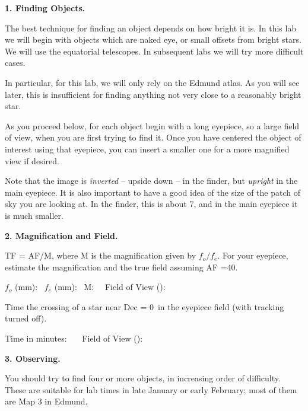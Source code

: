 
\noindent
{\bf 1. Finding Objects.}  

\noindent The best technique for finding an object depends on how
bright it is. In this lab we will begin with objects which are naked
eye, or small offsets from bright stars. We will use the equatorial
telescopes. In subsequent labs we will try more difficult cases.

\medskip\noindent In particular, for this lab, we will only rely on
the Edmund atlas.  As you will see later, this is insufficient for
finding anything not very close to a reasonably bright star.

\medskip\noindent As you proceed below, for each object begin with a
long eyepiece, so a large field of view, when you are first trying to
find it. Once you have centered the object of interest using that
eyepiece, you can insert a smaller one for a more magnified view if
desired.

\medskip\noindent Note that the image is \emph{inverted} -- upside
down -- in the finder, but \emph{upright} in the main eyepiece. It is
also important to have a good idea of the size of the patch of sky
you are looking at. In the finder, this is about 7\deg, and in the
main eyepiece it is much smaller.

\bigskip
\bigskip
\bigskip
\noindent
{\bf 2. Magnification and Field.}

\medskip{} TF = AF/M, where M
is the magnification given by $f_o/f_e$. For your eyepiece, estimate
the magnification and the true field assuming AF =40\deg.

\medskip\noindent $f_o$ (mm): \makebox[1.5cm]{\hrulefill} \ $f_e$
(mm): \makebox[1.5cm]{\hrulefill} \ M: \makebox[1.5cm]{\hrulefill} \ \
Field of View (\arcmin):\makebox[2cm]{\hrulefill}


\medskip{} Time the crossing of a star
near Dec = 0\deg\ in the eyepiece field (with tracking turned off).

\medskip\noindent Time in minutes: \makebox[2cm]{\hrulefill} \ \ \ Field
of View (\arcmin): \makebox[2cm]{\hrulefill}

\bigskip
\bigskip
\bigskip\noindent
{\bf 3. Observing.} 

\medskip\noindent You should try to find four or more objects, in
increasing order of difficulty.  These are suitable for lab times in
late January or early February; most of them are Map 3 in Edmund.

